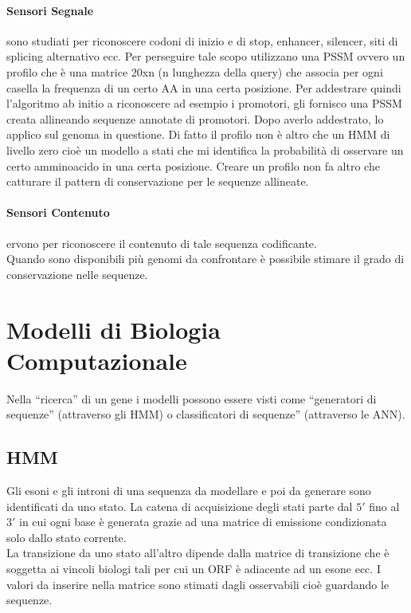 \documentclass{article}
\begin{document}
\paragraph{Sensori Segnale}  sono studiati per riconoscere codoni di inizio e di stop, enhancer, silencer, siti di splicing alternativo ecc. Per perseguire tale scopo utilizzano una PSSM ovvero un profilo che è una matrice 20xn (n lunghezza della query) che associa per ogni casella la frequenza di un certo AA in una certa posizione.
Per addestrare quindi l'algoritmo ab initio a riconoscere ad esempio i promotori, gli fornisco una PSSM creata allineando sequenze annotate di promotori. Dopo averlo addestrato, lo applico sul genoma in questione.
Di fatto il profilo non è altro che un HMM di livello zero cioè un modello a stati che mi identifica la probabilità di osservare un certo amminoacido in una certa posizione. Creare un profilo non fa altro che catturare il pattern di conservazione per le sequenze allineate.
\paragraph{Sensori Contenuto} ervono per riconoscere il contenuto di tale sequenza codificante.\\
Quando sono disponibili più genomi da confrontare è possibile stimare il grado di conservazione nelle sequenze.
\section{Modelli di Biologia Computazionale}
Nella “ricerca” di un gene i modelli possono essere visti come “generatori di sequenze” (attraverso gli HMM) o classificatori di sequenze” (attraverso le ANN).
\subsection{HMM} Gli esoni e gli introni di una sequenza da modellare e poi da generare sono identificati da uno stato. La catena di acquisizione degli stati parte dal $5'$ fino al $3'$ in cui ogni base è generata grazie ad una matrice di emissione condizionata solo dallo stato corrente. \\
La transizione da uno stato all’altro dipende dalla matrice di transizione che è soggetta ai vincoli biologi tali per cui un ORF è adiacente ad un esone ecc.
I valori da inserire nella matrice sono stimati dagli osservabili cioè guardando le sequenze.
\end{document}
